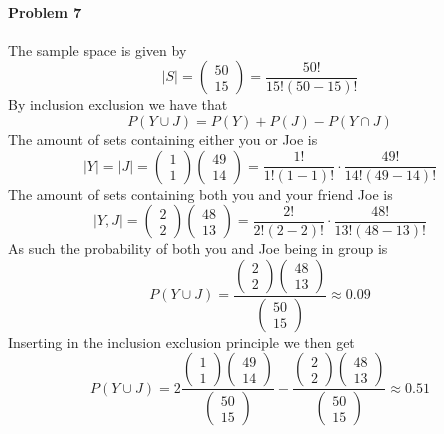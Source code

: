 \paragraph{Problem 7}
The sample space is given by
\[
    |S|=\begin{pmatrix}50\\15\end{pmatrix}=\frac{50!}{15!(50-15)!}
\]
By inclusion exclusion we have that
\[
    P(Y\cup J)=P(Y)+P(J)-P(Y\cap J)
\]
The amount of sets containing either you or Joe is
\[
    |Y|=|J|=\begin{pmatrix}1\\1\end{pmatrix}\begin{pmatrix}49\\14\end{pmatrix}=\frac{1!}{1!(1-1)!}\cdot\frac{49!}{14!(49-14)!}
\]
The amount of sets containing both you and your friend Joe is
\[
    |Y,J|=\begin{pmatrix}2\\2\end{pmatrix}\begin{pmatrix}48\\13\end{pmatrix}=\frac{2!}{2!(2-2)!}\cdot\frac{48!}{13!(48-13)!}
\]
As such the probability of both you and Joe being in group is
\[
    P(Y\cup J)=\frac{\begin{pmatrix}2\\2\end{pmatrix}\begin{pmatrix}48\\13\end{pmatrix}}{\begin{pmatrix}50\\15\end{pmatrix}}\approx 0.09
\]
Inserting in the inclusion exclusion principle we then get
\[
    P(Y\cup J)=2\frac{\begin{pmatrix}1\\1\end{pmatrix}\begin{pmatrix}49\\14\end{pmatrix}}{\begin{pmatrix}50\\15\end{pmatrix}}-\frac{\begin{pmatrix}2\\2\end{pmatrix}\begin{pmatrix}48\\13\end{pmatrix}}{\begin{pmatrix}50\\15\end{pmatrix}}\approx 0.51
\]
